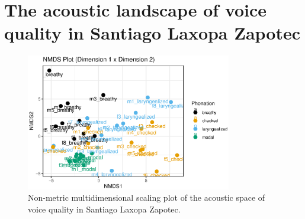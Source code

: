 \chapter{The acoustic landscape of voice quality in Santiago Laxopa Zapotec} \label{ch:acousticlandscape}

\begin{figure}
\centering
\includegraphics[width=0.8\textwidth]{images/nmds12.eps}
\caption{Non-metric multidimensional scaling plot of the acoustic space of voice quality in Santiago Laxopa Zapotec.}
\label{fig:nmds12}
\end{figure}